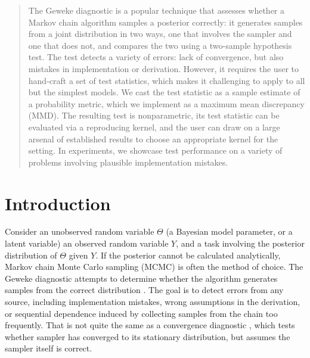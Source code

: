 \documentclass{article}
\begin{document}
\begin{abstract}
The Geweke diagnostic is a popular technique that assesses whether a Markov chain
  algorithm samples a posterior correctly: it
  generates samples from a joint distribution in two ways,
  one that involves the sampler and one that does not, and compares
  the two using a two-sample hypothesis test. 
  The test detects a variety of errors: lack of
  convergence, but also mistakes in implementation or derivation.
  However, it requires the user to hand-craft a set of test statistics, which makes it 
  challenging to apply to all but the simplest models.
  We cast the test statistic as a sample estimate of a probability metric, which we implement as a maximum mean discrepancy (MMD).
The resulting test is nonparametric, its test statistic can be evaluated via a reproducing kernel, and the user can draw on a large arsenal of established results to choose an appropriate kernel for the setting.
  In experiments, we showcase test performance on a variety of problems involving plausible implementation mistakes.
\end{abstract}  


\section{Introduction}
\label{section:intro}

Consider an unobserved
random variable $\Theta$ (a Bayesian model parameter, or a latent variable)
an observed random variable $Y$, and a task involving the
posterior distribution of $\Theta$ given $Y$. If the posterior cannot
be calculated analytically, Markov chain Monte Carlo sampling
(MCMC) is often the method of choice.
The Geweke diagnostic attempts to determine
whether the algorithm generates samples from the correct distribution
\cite{geweke_getting_2004}.
The goal is to detect errors from any source, including 
implementation mistakes, wrong assumptions in the
derivation, or sequential dependence induced by collecting samples from the chain too
frequently.
That is not quite the same as a convergence diagnostic \citep[see e.g.][]{robert_short_2011}, which tests whether
sampler has converged to its stationary distribution, but assumes the sampler itself
is correct.
\end{document}
